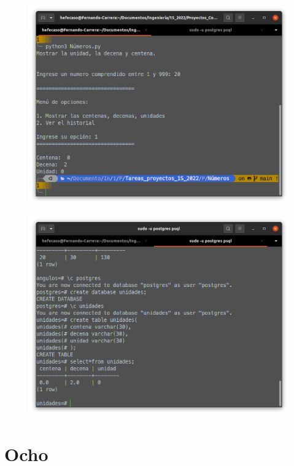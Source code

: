 \documentclass[12pt,letterpaper]{article}
\begin{document}
\begin{multicols}{2}
\begin{figure}[H]
\centering
\includegraphics[width = \columnwidth]{3-1.png}
\end{figure}


\begin{figure}[H]
\centering
\includegraphics[width = \columnwidth]{3-2.png}
\end{figure}


\section{Ocho}


\end{multicols}
\end{document}
